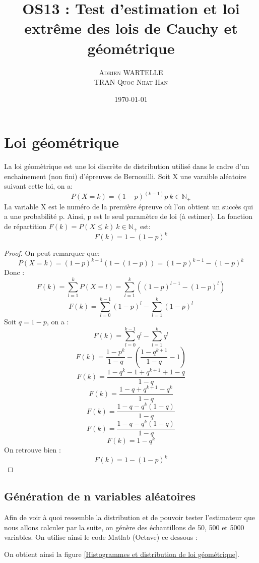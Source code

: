 \documentclass[12pt,a4paper,titlepage]{article}
\title{OS13 : Test d'estimation et loi extrême des lois de Cauchy et géométrique}
\author{\textsc{Adrien WARTELLE} \\ \textsc{TRAN Quoc Nhat Han}}
\date{\today}
\begin{document}
\maketitle 
\renewcommand{\contentsname}{Sommaire}
\tableofcontents

\newpage

\section{Loi géométrique}

La loi géomètrique est une loi discrète de distribution utilisé
dans le cadre d'un enchainement (non fini) d'épreuves de Bernouilli. Soit
X une varaible aléatoire suivant cette loi, on a:
\[P(X=k) = (1-p)^(k-1)p\ k\in\mathbb{N}_{+}\]
La variable X est le numéro de la première épreuve où l'on obtient un succès
qui a une probabilité p. Ainsi, p est le seul paramètre de loi (à estimer).
La fonction de répartition $F(k) = P(X\leq{}k)\ k\in\mathbb{N}_{+}$ est:
\[F(k)=1-(1-p)^{k}\]
\begin{proof}
On peut remarquer que:
\[P(X=k)=(1-p)^{k-1}(1-(1-p))=(1-p)^{k-1}-(1-p)^{k}\]
Donc :
\[F(k)=\sum\limits_{l=1}^{k}P(X=l)=\sum\limits_{l=1}^{k}((1-p)^{l-1}-(1-p)^{l})\]
\[F(k)=\sum\limits_{l=0}^{k-1}(1-p)^{l}-\sum\limits_{l=1}^{k}(1-p)^{l}\]
Soit $q=1-p$, on a :
\[F(k)=\sum\limits_{l=0}^{k-1}q^{l}-\sum\limits_{l=1}^{k}q^{l}\]
\[F(k)=\frac{1-p^k}{1-q}-(\frac{1-q^{k+1}}{1-q}-1)\]
\[F(k)=\frac{1-q^k-1+q^{k+1}+1-q}{1-q}\]
\[F(k)=\frac{1-q+q^{k+1}-q^k}{1-q}\]
\[F(k)=\frac{1-q-q^k(1-q)}{1-q}\]
\[F(k)=\frac{1-q-q^k(1-q)}{1-q}\]
\[F(k)=1-q^k\]
On retrouve bien :
\[F(k)=1-(1-p)^k\]
\end{proof}

\subsection{Génération de n variables aléatoires}

Afin de voir à quoi ressemble la distribution et de pouvoir tester l'estimateur que
nous allons calculer par la suite, on génère des échantillons de 50, 500 et 5000 variables.
On utilise ainsi le code Matlab (Octave) ce dessous :



On obtient ainsi la figure \ref{Histogrammes et distribution de loi géométrique}.
\end{document}

